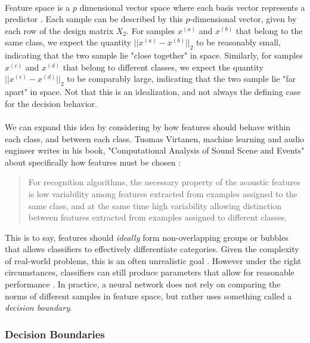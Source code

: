 \documentclass[12pt,letterpaper]{article}
\begin{document}
\paragraph*{}Feature space is a $p$ dimensional vector space where each basis vector represents a predictor \cite{Goodfellow,James}. Each sample can be described by this $p$-dimensional vector, given by each row of the design matrix $X_2$. For samples $x^{(a)}$ and $x^{(b)}$ that belong to the same class, we expect the quantity $||x^{(a)} - x^{(b)}||_{2}$ to be reasonably small, indicating that the two sample lie "close together" in space. Similarly, for samples $x^{(c)}$ and $x^{(d)}$ that belong to different classes, we expect the quantity $||x^{(c)} - x^{(d)}||_{2}$ to be comparably large, indicating that the two sample lie "far apart" in space. Not that this is an idealization, and not always the defining case for the decision behavior.

\paragraph*{}We can expand this idea by considering by how features should behave within each class, and between each class. Tuomas Virtanen, machine learning and audio engineer writes in his book, "Computational Analysis of Sound Scene and Events" about specifically how features must be chosen \cite{Virtanen}:
\begin{quote}
For recognition algorithms, the necessary property of the acoustic features is low variability among features extracted from examples assigned to the same class, and at the same time high variability allowing distinction between features extracted from examples assigned to different classes.
\end{quote}
This is to say, features should \textit{ideally} form non-overlapping groups or bubbles that allows classifiers to effectively differentiate categories. Given the complexity of real-world problems, this is an often unrealistic goal \cite{Goodfellow,James}. However under the right circumstances, classifiers can still produce parameters that allow for reasonable performance \cite{Geron,Loy}. In practice, a neural network does not rely on comparing the norms of different samples in feature space, but rather uses something called a \textit{decision boundary}.

\subsubsection{Decision Boundaries}
\label{subsubsec-Decision}
\end{document}

